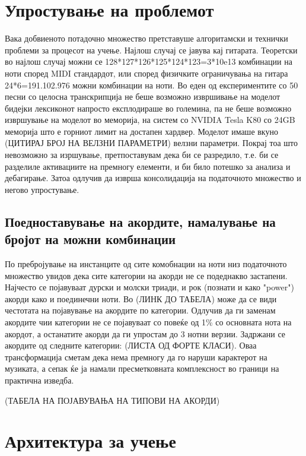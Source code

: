 \section{Упростување на проблемот}

Вака добвиеното потадочно множество претставуше алгоритамски и технички проблеми за процесот на учење. Најлош случај се јавува кај гитарата. Теоретски во најлош случај можни се 128*127*126*125*124*123=3*10e13 комбинации на ноти според MIDI стандардот, или според физичките ограничувања на гитара 24*6=191.102.976 можни комбинации на ноти. Во еден од експериментите со 50 песни со целосна транскрипција не беше возможно извршивање на моделот бидејки лексиконот напросто експлодираше во големина, па не беше возможно извршување на моделот во меморија, на систем со NVIDIA Tesla K80 со 24GB меморија што е горниот лимит на достапен хардвер. Моделот имаше вкуно (ЦИТИРАЈ БРОЈ НА ВЕЛЗНИ ПАРАМЕТРИ) велзни параметри. Покрај тоа што невозможно за изршување, претпоставувам дека би се разредило, т.е. би се разделиле активациите на премногу елементи, и би било потешко за анализа и дебагирање. Затоа одлучив да изврша консолидација на податочното множество и негово упростување.

\subsection{Поедноставување на акордите, намалување на бројот на можни комбинации}

По пребројување на инстанците од сите комобнации на ноти низ податочното множество увидов дека сите категории на акорди не се подеднакво застапени. Најчесто се појавуваат дурски и молски триади, и рок (познати и како "power") акорди како и поединечни ноти. Во (ЛИНК ДО ТАБЕЛА) може да се види честотата на појавување на акордите по категории. Одлучив да ги заменам акордите чии категории не се појавуваат со повеќе од 1\% со основната нота на акордот, а останатите акорди да ги упростам до 3 нотни верзии. Задржани се акордите од следните категории: (ЛИСТА ОД ФОРТЕ КЛАСИ). Оваа трансформација сметам дека нема премногу да го наруши карактерот на музиката, а сепак ќе ја намали пресметковната комплексност во граници на практична изведба.

(ТАБЕЛА НА ПОЈАВУВАЊА НА ТИПОВИ НА АКОРДИ)

\section{Архитектура за учење}

